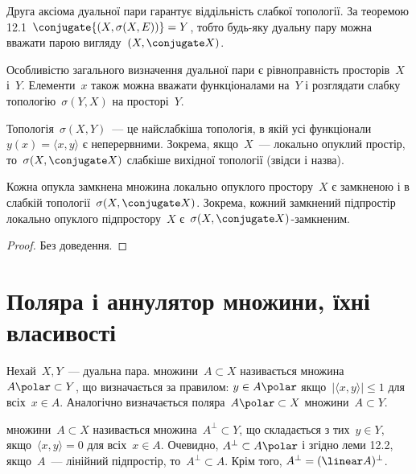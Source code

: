 \begin{remark}
    Друга аксіома дуальної пари гарантує віддільність слабкої топології. За теоремою 12.1~$\conjugate{(X, \sigma(X, E))} = Y$, тобто будь-яку дуальну пару можна вважати парою вигляду~$(X, \conjugate X)$.
\end{remark}

\begin{remark}
    Особливістю загального визначення дуальної пари є рівноправність просторів~$X$ і~$Y$. Елементи~$x$ також можна вважати функціоналами на~$Y$ і розглядати слабку топологію~$\sigma(Y, X)$ на просторі~$Y$.
\end{remark}

\begin{remark}
    Топологія~$\sigma(X, Y)$~--- це найслабкіша топологія, в якій усі функціонали~$y(x) = \langle x, y \rangle$ є неперервними. Зокрема, якщо~$X$~--- локально опуклий простір, то~$\sigma(X, \conjugate X)$ слабкіше вихідної топології (звідси і назва).
\end{remark}

\begin{theorem}
    Кожна опукла замкнена множина локально опуклого простору~$X$ є замкненою і в слабкій топології~$\sigma(X, \conjugate X)$. Зокрема, кожний замкнений підпростір локально опуклого підпростору~$X$ є~$\sigma(X, \conjugate X)$-замкненим.
\end{theorem}

\begin{proof}
    Без доведення.
\end{proof}

\section{Поляра і аннулятор множини, їхні власивості}

\begin{definition}
    Нехай~$X, Y$~--- дуальна пара.  множини~$A \subset X$ називається множина~$A\polar \subset Y$, що визначається за правилом: $y \in A\polar$ якщо~$|\langle x, y \rangle| \le 1$ для всіх~$x \in A$. Аналогічно визначається поляра~$A\polar \subset X$ множини~$A \subset Y$.
\end{definition}

\begin{definition}
     множини~$A \subset X$ називається множина~$A^\perp \subset Y$, що складається з тих~$y \in Y$, якщо~$\langle x, y \rangle = 0$ для всіх~$x \in A$. Очевидно, $A^\perp \subset A\polar$ і згідно леми 12.2, якщо~$A$~--- лінійний підпростір, то~$A^\perp \subset A$. Крім того, $A^\perp = (\linear A)^\perp$.
\end{definition}

